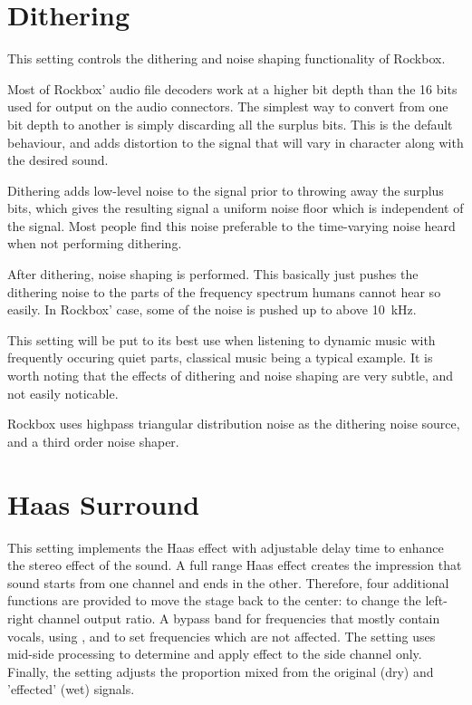 \section{Dithering}
This setting controls the dithering and noise shaping functionality of Rockbox.

Most of Rockbox' audio file decoders work at a higher bit depth than the 16 bits
used for output on the \daps{} audio connectors. The simplest way to
convert from one bit depth to another is simply discarding all the surplus bits.
This is the default behaviour, and adds distortion to the signal that will
vary in character along with the desired sound.

Dithering adds low-level noise to the signal prior to throwing away the surplus
bits, which gives the resulting signal a uniform noise floor which is
independent of the signal. Most people find this noise preferable to the
time-varying noise heard when not performing dithering.

After dithering, noise shaping is performed. This basically just pushes the
dithering noise to the parts of the frequency spectrum humans cannot hear so
easily. In Rockbox' case, some of the noise is pushed up to above 10~kHz.

This setting will be put to its best use when listening to dynamic music with
frequently occuring quiet parts, classical music being a typical example. It is
worth noting that the effects of dithering and noise shaping are very subtle,
and not easily noticable.

Rockbox uses highpass triangular distribution noise as the dithering noise
source, and a third order noise shaper.


\section{Haas Surround}
This setting implements the Haas effect with adjustable delay time to enhance
the stereo effect of the sound. A full range Haas effect creates the impression
that sound  starts from one channel and ends in the other.  Therefore, four additional
functions are provided to move the stage back to the center:
 to change the left-right channel output ratio.
A bypass band for frequencies that mostly contain vocals, using ,
and  to set frequencies which are not affected. The 
setting uses mid-side processing to determine and apply effect to the side channel only.
Finally, the  setting adjusts the proportion mixed from the
original (dry) and 'effected' (wet) signals.


